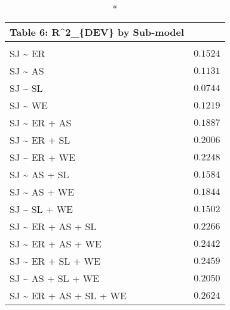 \begin{longtable}{lr}
\caption*{
{\large Table 6: R\textasciicircum{}2\_\{DEV\} by Sub-model}
} \\ 
\toprule
 &  \\ 
\midrule\addlinespace[2.5pt]
SJ \textasciitilde{} ER & $0.1524$ \\ 
SJ \textasciitilde{} AS & $0.1131$ \\ 
SJ \textasciitilde{} SL & $0.0744$ \\ 
SJ \textasciitilde{} WE & $0.1219$ \\ 
SJ \textasciitilde{} ER + AS & $0.1887$ \\ 
SJ \textasciitilde{} ER + SL & $0.2006$ \\ 
SJ \textasciitilde{} ER + WE & $0.2248$ \\ 
SJ \textasciitilde{} AS + SL & $0.1584$ \\ 
SJ \textasciitilde{} AS + WE & $0.1844$ \\ 
SJ \textasciitilde{} SL + WE & $0.1502$ \\ 
SJ \textasciitilde{} ER + AS + SL & $0.2266$ \\ 
SJ \textasciitilde{} ER + AS + WE & $0.2442$ \\ 
SJ \textasciitilde{} ER + SL + WE & $0.2459$ \\ 
SJ \textasciitilde{} AS + SL + WE & $0.2050$ \\ 
SJ \textasciitilde{} ER + AS + SL + WE & $0.2624$ \\ 
\bottomrule
\end{longtable}

